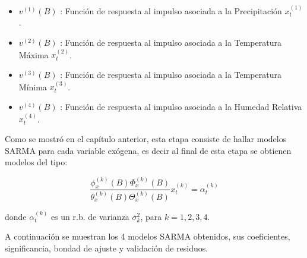 \documentclass[12pt,oneside]{book}\usepackage[]{graphicx}\usepackage[]{color}
\theoremstyle{definition} %
\begin{document}
\begin{itemize}
\item $v^{(1)}(B)$ : Función de respuesta al impulso asociada a la Precipitación $x^{(1)}_t$.
\item $v^{(2)}(B)$ : Función de respuesta al impulso asociada a la Temperatura Máxima $x^{(2)}_t$.
\item $v^{(3)}(B)$ : Función de respuesta al impulso asociada a la Temperatura Mínima $x^{(3)}_t$.
\item $v^{(4)}(B)$ : Función de respuesta al impulso asociada a la Humedad Relativa $x^{(4)}_t$.
\end{itemize}


Como se mostró en el capítulo anterior, esta etapa consiste de hallar modelos SARMA para cada variable exógena, es decir al final de esta etapa se obtienen modelos del tipo:


$$\frac{ \phi_x^{(k)}(B) \Phi_x^{(k)}(B) }{\theta_x^{(k)}(B) \Theta_x^{(k)}(B)} x^{(k)}_t= \alpha^{(k)}_t $$

donde $\alpha^{(k)}_t$ es un r.b. de varianza $\sigma^2_k$, para $k=1,2,3,4$.

A continuación se muestran los 4 modelos SARMA obtenidos, sus coeficientes, significancia, bondad de ajuste y validación de residuos.
\end{document}
